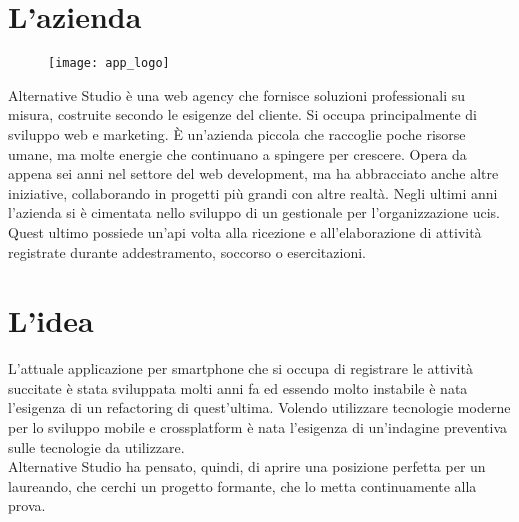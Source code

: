
\section{L'azienda}

\begin{figure}[htbp]
\begin{center}
\texttt{[image: app\_logo]}
\end{center}
\end{figure}

Alternative Studio è una web agency che fornisce soluzioni professionali su misura, costruite secondo le esigenze del cliente. Si occupa principalmente di sviluppo web e marketing. È un'azienda piccola che raccoglie poche risorse umane, ma molte energie che continuano a spingere per crescere. Opera da appena sei anni nel settore del web development, ma ha abbracciato anche altre iniziative, collaborando in progetti più grandi con altre realtà.
Negli ultimi anni l'azienda si è cimentata nello sviluppo di un gestionale per l'organizzazione \gls{ucis}. Quest ultimo possiede un'\gls{api} volta alla ricezione e all'elaborazione di attività registrate durante addestramento, soccorso o esercitazioni.

\section{L'idea}

L'attuale applicazione per smartphone che si occupa di registrare le attività succitate è stata sviluppata molti anni fa ed essendo molto instabile è nata l'esigenza di un refactoring di quest'ultima. Volendo utilizzare tecnologie moderne per lo sviluppo mobile e crossplatform è nata l'esigenza di un'indagine preventiva sulle tecnologie da utilizzare. \\
Alternative Studio ha pensato, quindi, di aprire una posizione perfetta per un laureando, che cerchi un progetto formante, che lo metta continuamente alla prova.

